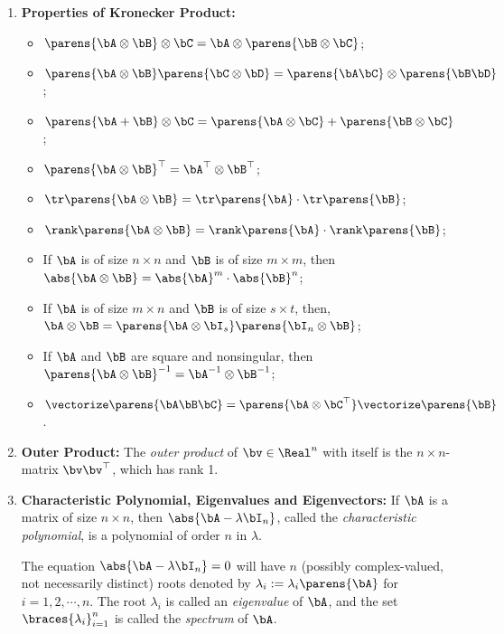 \documentclass[12pt]{article}
\begin{document}
\begin{enumerate}[label=\textbf{\arabic*.}]
	\item \textbf{Properties of Kronecker Product:} 
	\begin{itemize}
		\item $\parens{\bA \otimes \bB} \otimes \bC = \bA \otimes \parens{\bB \otimes \bC}$; 
		\item $\parens{\bA \otimes \bB} \parens{\bC \otimes \bD} = \parens{\bA \bC} \otimes \parens{\bB \bD}$; 
		\item $\parens{\bA + \bB} \otimes \bC = \parens{\bA \otimes \bC} + \parens{\bB \otimes \bC}$; 
		\item $\parens{\bA \otimes \bB}^\top = \bA^\top \otimes \bB^\top$; 
		\item $\tr \parens{\bA \otimes \bB} = \tr \parens{\bA} \cdot \tr \parens{\bB}$; 
		\item $ \rank \parens{\bA \otimes \bB} = \rank \parens{\bA} \cdot \rank \parens{\bB} $; 
		\item If $\bA$ is of size $n \times n$ and $\bB$ is of size $m \times m$, then $\abs{\bA \otimes \bB} = \abs{\bA}^m \cdot \abs{\bB}^n$; 
		\item If $\bA$ is of size $m \times n$ and $\bB$ is of size $s \times t$, then, $\bA \otimes \bB = \parens{\bA \otimes \bI_s} \parens{\bI_n \otimes \bB} $; 
		\item If $\bA$ and $\bB$ are square and nonsingular, then $\parens{\bA \otimes \bB}^{-1} = \bA^{-1} \otimes \bB^{-1}$; 
		\item $ \vectorize \parens{\bA \bB \bC} = \parens{\bA \otimes \bC^\top} \vectorize \parens{\bB}$. 
	\end{itemize}
	
	\item \textbf{Outer Product:} The \textit{outer product} of $\bv \in \Real^n$ with itself is the $n \times n$-matrix $\bv \bv^\top$, which has rank 1. 
	
	\item \textbf{Characteristic Polynomial, Eigenvalues and Eigenvectors:} If $\bA$ is a matrix of size $n \times n$, then $\abs{\bA - \lambda \bI_n}$, called the \textit{characteristic polynomial}, is a polynomial of order $n$ in $\lambda$. 
	
	The equation $\abs{ \bA - \lambda \bI_n } = 0$ will have $n$ (possibly complex-valued, not necessarily distinct) roots denoted by $\lambda_i := \lambda_i \parens{\bA}$ for $i = 1, 2, \cdots, n$. The root $\lambda_i$ is called an \textit{eigenvalue} of $\bA$, and the set $\braces{\lambda_i}_{i=1}^n$ is called the \textit{spectrum} of $\bA$. 
	

\end{enumerate}
\end{document}
